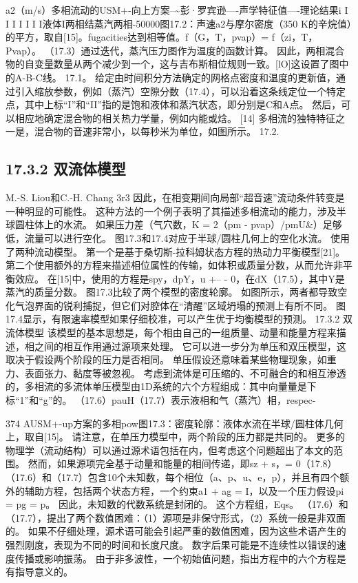 \documentclass[UTF8,11pt,a4paper,openany,fontset=fandol]{ctexbook}
\begin{document}
a2（m/s）多相流动的USM+-向上方案--\textasciitilde{}彭·罗宾逊----声学特征值----理论结果i I I I I I I I液体I两相结蒸汽两相-50000图17.2：声速a2与摩尔密度（350 K的辛烷值）的平方，取自[15]。fugacities达到相等值。f（G，T，pvap）= f（zi，T，Pvap）。 （17.3）通过迭代，蒸汽压力图作为温度的函数计算。 因此，两相混合物的自变量数量从两个减少到一个，这与吉布斯相位规则一致。[lO]这设置了图中的A-B-C线。 17.1。 给定由时间积分方法确定的网格点密度和温度的更新值，通过引入缩放参数，例如（蒸汽）空隙分数（17.4），可以沿着这条线定位一个特定点，其中上标“I”和“II”指的是饱和液体和蒸汽状态，即分别是C和A点。 然后，可以相应地确定混合物的相关热力学量，例如内能或焓。 [14] 多相流的独特特征之一是，混合物的音速非常小，以每秒米为单位，如图所示。 17.2.

\subsection{17.3.2 双流体模型}
M.-S. Liou和C.-H. Chang 3r3 因此，在相变期间向局部“超音速”流动条件转变是一种明显的可能性。 这种方法的一个例子表明了其描述多相流动的能力，涉及半球圆柱体上的水流。 如果压力差（气穴数，K = 2（pm - pvap）/pmU\&）足够低，流量可以进行空化。 图17.3和17.4对应于半球/圆柱几何上的空化水流。 使用了两种流动模型。 第一个是基于桑切斯-拉科姆状态方程的热动力平衡模型[21]。 第二个使用额外的方程来描述相位属性的传输，如体积或质量分数，从而允许非平衡效应。 在[15]中，使用的方程是spy，dpY，u +-- - 0，在dX（17.5），其中Y是蒸汽的质量分数。 图17.3比较了两个模型的密度轮廓。 如图所示，两者都导致空化气泡界面的锐利捕捉，但它们对腔体在“清醒”区域坍塌的预测上有所不同。 图17.4显示，有限速率模型如果仔细校准，可以产生优于均衡模型的预测。 17.3.2 双流体模型 该模型的基本思想是，每个相由自己的一组质量、动量和能量方程来描述，相之间的相互作用通过源项来处理。 它可以进一步分为单压和双压模型，这取决于假设两个阶段的压力是否相同。 单压假设还意味着某些物理现象，如重力、表面张力、黏度等被忽视。 考虑到流体是可压缩的、不可融合的和相互渗透的，多相流的多流体单压模型由1D系统的六个方程组成：其中向量量是下标“1”和“g”的。 （17.6）pauH（17.7）表示液相和气（蒸汽）相，respec-

374 AUSM+-up方案的多相pow图17.3：密度轮廓：液体水流在半球/圆柱体几何上，取自[15]。 请注意，在单压力模型中，两个阶段的压力都是共同的。 更多的物理学（流动结构）可以通过源术语包括在内，但考虑这个问题超出了本文的范围。 然而，如果源项完全基于动量和能量的相间传递，即sz + s，= 0（17.8）（17.6）和（17.7）包含10个未知数，每个相位（a、p、u、e，p），并且有四个额外的辅助方程，包括两个状态方程，一个约束a1 + ag = I，以及一个压力假设pi = pg = p。 因此，未知数的代数系统是封闭的。 这个方程组，Eqs。 （17.6）和（17.7），提出了两个数值困难：（1）源项是非保守形式，（2）系统一般是非双面的。 如果不仔细处理，源术语可能会引起严重的数值困难，因为这些术语产生的强烈刚度，表现为不同的时间和长度尺度。 数字后果可能是不连续性以错误的速度传播或影响振荡。 由于非多波性，一个初始值问题，指出方程中的六个方程是有指导意义的。
\end{document}
